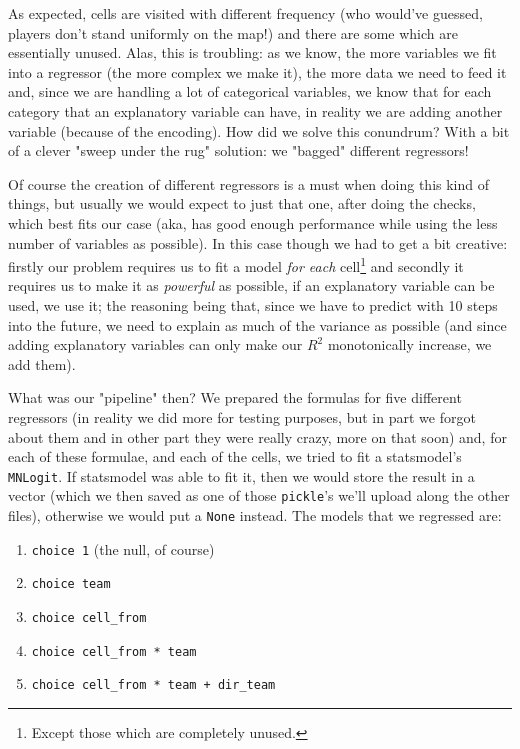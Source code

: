 \documentclass[9pt, a4paper]{IEEEtran}
\begin{document}
    As expected, cells are visited with different frequency (who would've guessed, players don't stand uniformly on the map!) and there are some which are essentially unused.
    Alas, this is troubling: as we know, the more variables we fit into a regressor (the more complex we make it), the more data we need to feed it and, since we are handling a lot of categorical variables, we know that for each category that an explanatory variable can have, in reality we are adding another variable (because of the encoding). How did we solve this conundrum? With a bit of a clever "sweep under the rug" solution: we "bagged" different regressors!

    Of course the creation of different regressors is a must when doing this kind of things, but usually we would expect to just that one, after doing the checks, which best fits our case (aka, has good enough performance while using the less number of variables as possible). In this case though we had to get a bit creative: firstly our problem requires us to fit a model \emph{for each} cell\footnote{Except those which are completely unused.} and secondly it requires us to make it as \emph{powerful} as possible, if an explanatory variable can be used, we use it; the reasoning being that, since we have to predict with 10 steps into the future, we need to explain as much of the variance as possible (and since adding explanatory variables can only make our $R^2$ monotonically increase, we add them).

    What was our "pipeline" then? We prepared the formulas for five different regressors (in reality we did more for testing purposes, but in part we forgot about them and in other part they were really crazy, more on that soon) and, for each of these formulae, and each of the cells, we tried to fit a statsmodel's \texttt{MNLogit}. If statsmodel was able to fit it, then we would store the result in a vector (which we then saved as one of those \texttt{pickle}'s we'll upload along the other files), otherwise we would put a \texttt{None} instead. The models that we regressed are:

    \begin{enumerate}
        \item \texttt{choice \raisebox{-0.7ex}{\textasciitilde} 1} (the null, of course)
        \item \texttt{choice \raisebox{-0.7ex}{\textasciitilde} team}
        \item \texttt{choice \raisebox{-0.7ex}{\textasciitilde} cell\_from}
        \item \texttt{choice \raisebox{-0.7ex}{\textasciitilde} cell\_from * team}
        \item \texttt{choice \raisebox{-0.7ex}{\textasciitilde} cell\_from * team + dir\_team}
    \end{enumerate}
\end{document}

